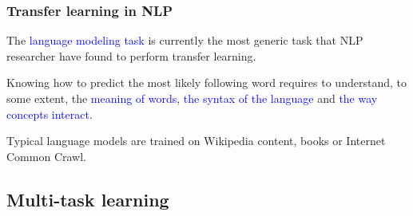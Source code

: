 \documentclass[10pt]{beamer}
\begin{document}
\begin{frame}

  \frametitle{Transfer learning in NLP}

  \begin{center}
    \scalebox{0.7}{
      
    }
  \end{center}

  The \textcolor{blue}{language modeling task} is currently the most
  generic task that NLP researcher have found to perform transfer
  learning.

  \bigskip

  Knowing how to predict the most likely following word requires to
  understand, to some extent, the \textcolor{blue}{meaning of words},
  \textcolor{blue}{the syntax of the language} and
  \textcolor{blue}{the way concepts interact}.

  \bigskip

  Typical language models are trained on Wikipedia content, books or
  Internet Common Crawl.

\end{frame}

\subsection{Multi-task learning}
\end{document}
